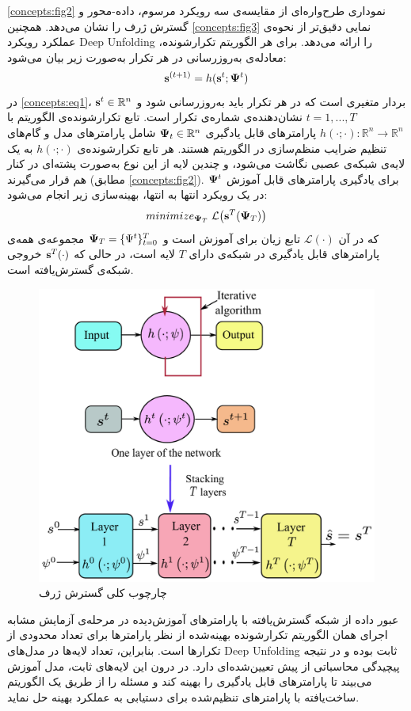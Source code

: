 \autoref{concepts:fig2}
 نموداری طرح‌واره‌ای از مقایسه‌ی سه رویکرد مرسوم، داده-محور و گسترش ژرف را نشان می‌دهد. همچنین  
\autoref{concepts:fig3}
  نمایی دقیق‌تر از نحوه‌ی عملکرد رویکرد
\gls{Deep Unfolding}
   را ارائه می‌دهد.
برای هر الگوریتم تکرارشونده، معادله‌ی به‌روزرسانی در هر تکرار به‌صورت زیر بیان می‌شود:
\begin{equation}
	\bold{s}^{(t+1)} = h(\bold{s}^{t};\bold{\Psi}^{t})
	\label{concepts:eq1}
\end{equation}
در 
\autoref{concepts:eq1}،
$\bold{s}^{t}\in\mathbb{R}^{n}$
بردار متغیری است که در هر تکرار باید به‌روزرسانی شود و
$t = 1,...,T$
نشان‌دهنده‌ی شماره‌ی تکرار است. تابع تکرارشونده‌ی الگوریتم با
$h(\cdot; \cdot): \mathbb{R}^n \rightarrow \mathbb{R}^n$
پارامترهای قابل یادگیری
$\bold{\Psi}_t \in \mathbb{R}^n$
شامل پارامترهای مدل و گام‌های تنظیم ضرایب منظم‌سازی در الگوریتم هستند. هر تابع تکرارشونده‌ی
$h(\cdot;\cdot)$
به یک لایه‌ی شبکه‌ی عصبی نگاشت می‌شود، و چندین لایه از این نوع به‌صورت پشته‌ای در کنار هم قرار می‌گیرند (مطابق 
\autoref{concepts:fig2}).
برای یادگیری پارامترهای قابل آموزش
$\bold{\Psi}^t$
در یک رویکرد انتها به انتها، بهینه‌سازی زیر انجام می‌شود:
\begin{equation}
	minimize_{\bold{\Psi}_T} \; \mathcal{L}\big(\bold{s}^T(\bold{\Psi}_T)\big)
\end{equation}
که در آن 
$\mathcal{L}(\cdot)$
تابع زیان برای آموزش است و
$\bold{\Psi}_T = \{ \Psi^t \}_{t=0}^{T}$
مجموعه‌ی همه‌ی پارامترهای قابل یادگیری در شبکه‌ی دارای
$T$
لایه است، در حالی که 
$\bold{s}^{T}(\cdot)$
خروجی شبکه‌ی گسترش‌یافته است.
\begin{figure}
	\centering
	\includegraphics[width=0.5\linewidth]{./Pic/ComprehensiveReview_concepts_fig3}
	\caption[ چارچوب کلی گسترش ژرف]{چارچوب کلی گسترش ژرف \cite{ComprehensiveReview}}
	\label{concepts:fig3}
\end{figure}
عبور داده از شبکه‌ گسترش‌یافته با پارامترهای آموزش‌دیده در مرحله‌ی آزمایش مشابه اجرای همان الگوریتم تکرارشونده بهینه‌شده از نظر پارامترها برای تعداد محدودی از تکرارها است. بنابراین، تعداد لایه‌ها در مدل‌های 
\gls{Deep Unfolding}
 ثابت بوده و در نتیجه پیچیدگی محاسباتی از پیش تعیین‌شده‌ای دارد. در درون این لایه‌های ثابت، مدل آموزش می‌بیند تا پارامترهای قابل یادگیری را بهینه کند و مسئله را از طریق یک الگوریتم ساخت‌یافته با پارامترهای تنظیم‌شده برای دستیابی به عملکرد بهینه حل نماید.

